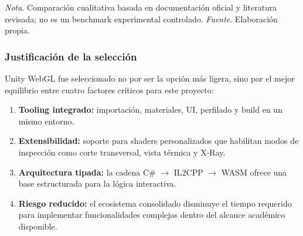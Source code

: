 \begin{table}[H]
\centering
\caption{Comparativa de soluciones Web 3D}
\small
{}
\par\vspace{0.5\baselineskip}
\textit{Nota}. Comparaci\'on cualitativa basada en documentaci\'on oficial y literatura revisada; no es un benchmark experimental controlado. \textit{Fuente}. Elaboraci\'on propia.
\end{table}

\subsubsection{Justificaci\'on de la selecci\'on}

Unity WebGL fue seleccionado no por ser la opci\'on m\'as ligera, sino por el mejor equilibrio entre cuatro factores cr\'iticos para este proyecto:

\begin{enumerate}
    \item \textbf{Tooling integrado:} importaci\'on, materiales, UI, perfilado y build en un mismo entorno.
    \item \textbf{Extensibilidad:} soporte para shaders personalizados que habilitan modos de inspecci\'on como corte transversal, vista t\'ermica y X-Ray.
    \item \textbf{Arquitectura tipada:} la cadena C\# $\rightarrow$ IL2CPP $\rightarrow$ WASM ofrece una base estructurada para la l\'ogica interactiva.
    \item \textbf{Riesgo reducido:} el ecosistema consolidado disminuye el tiempo requerido para implementar funcionalidades complejas dentro del alcance acad\'emico disponible.
\end{enumerate}

\newpage
